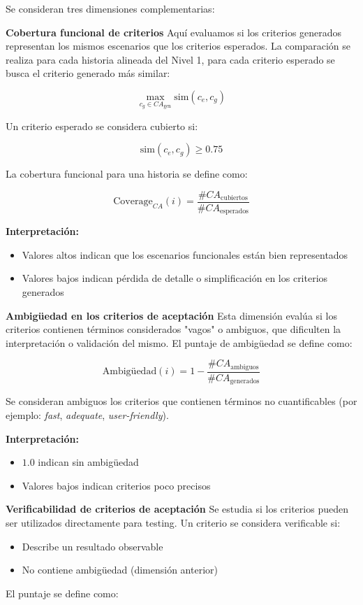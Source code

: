 Se consideran tres dimensiones complementarias:

\textbf{Cobertura funcional de criterios}
Aquí evaluamos si los criterios generados representan los mismos escenarios que los criterios esperados. La comparación se realiza para cada historia alineada del Nivel 1, para cada criterio esperado se busca el criterio generado más similar:

\[
\max_{c_g \in CA_{\text{gen}}} \text{sim}(c_e, c_g)
\]

Un criterio esperado se considera cubierto si:

\[
\text{sim}(c_e, c_g) \geq 0.75
\]

La cobertura funcional para una historia se define como:

\[
\text{Coverage}_{CA}(i) = 
\frac{\#CA_{\text{cubiertos}}}{\#CA_{\text{esperados}}}
\]

\textbf{Interpretación:}

\begin{itemize}
    \item Valores altos indican que los escenarios funcionales están bien representados
    \item Valores bajos indican pérdida de detalle o simplificación en los criterios generados
\end{itemize}

\textbf{Ambigüedad en los criterios de aceptación}
Esta dimensión evalúa si los criterios contienen términos considerados "vagos" o ambiguos, que dificulten la interpretación o validación del mismo.
El puntaje de ambigüedad se define como:

\[
\text{Ambig\"uedad}(i) = 
1 - \frac{\#CA_{\text{ambiguos}}}{\#CA_{\text{generados}}}
\]

Se consideran ambiguos los criterios que contienen términos no cuantificables (por ejemplo: \textit{fast}, \textit{adequate}, \textit{user-friendly}).

\textbf{Interpretación:}

\begin{itemize}
    \item $1.0$ indican sin ambigüedad
    \item Valores bajos indican criterios poco precisos
\end{itemize}

\textbf{Verificabilidad de criterios de aceptación}
Se estudia si los criterios pueden ser utilizados directamente para testing.
Un criterio se considera verificable si:
\begin{itemize}
    \item Describe un resultado observable
    \item No contiene ambigüedad (dimensión anterior)
\end{itemize}
El puntaje se define como:

